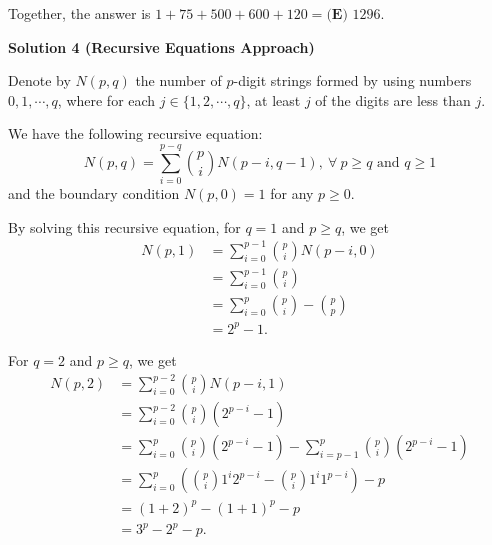 \begin{enumerate}
\begin{enumerate}
 
            \end{enumerate}
            Together, the answer is $1+75+500+600+120=\boxed{\textbf{(E) }1296}.$




\textbf{Solution 4 (Recursive Equations Approach)}

Denote by $N \left( p, q \right)$ the number of $p$-digit strings formed by using numbers $0, 1, \cdots, q$, where for each $j \in \{1,2, \cdots , q\}$, at least $j$ of the digits are less than $j$.

 We have the following recursive equation:
 \[N \left( p, q \right) = \sum_{i = 0}^{p - q} \binom{p}{i} N \left( p - i, q - 1 \right) , \ \forall \ p \geq q \mbox{ and } q \geq 1\]and the boundary condition $N \left( p, 0 \right) = 1$ for any $p \geq 0$.

 By solving this recursive equation, for $q = 1$ and $p \geq q$, we get
 \begin{align*} N \left( p , 1 \right) & = \sum_{i = 0}^{p - 1} \binom{p}{i} N \left( p - i, 0 \right) \\ & = \sum_{i = 0}^{p - 1} \binom{p}{i} \\ & = \sum_{i = 0}^p \binom{p}{i} - \binom{p}{p} \\ & = 2^p - 1 . \end{align*}


 For $q = 2$ and $p \geq q$, we get
 \begin{align*} N \left( p , 2 \right) & = \sum_{i = 0}^{p - 2} \binom{p}{i} N \left( p - i, 1 \right) \\ & = \sum_{i = 0}^{p - 2} \binom{p}{i} \left( 2^{p - i} - 1 \right) \\ & = \sum_{i = 0}^p \binom{p}{i} \left( 2^{p - i} - 1 \right) - \sum_{i = p - 1}^p \binom{p}{i} \left( 2^{p - i} - 1 \right) \\ & = \sum_{i = 0}^p \left( \binom{p}{i} 1^i 2^{p - i} - \binom{p}{i} 1^i 1^{p - i} \right) - p \\ & = \left( 1 + 2 \right)^p - \left( 1 + 1 \right)^p - p \\ & = 3^p - 2^p - p . \end{align*}



\end{enumerate}
